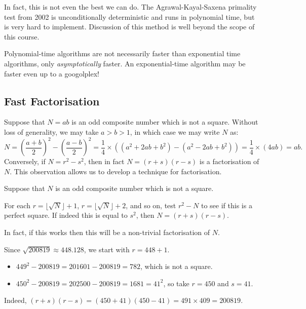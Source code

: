 \documentclass{article}
\begin{document}
\begin{note}
	In fact, this is not even the best we can do. The Agrawal-Kayal-Saxena primality test from 2002 is unconditionally deterministic and runs in polynomial time, but is very hard to implement. Discussion of this method is well beyond the scope of this course.
\end{note}

\begin{note}
	Polynomial-time algorithms are not necessarily faster than exponential time algorithms, only \textit{asymptotically} faster. An exponential-time algorithm may be faster even up to a googolplex!
\end{note}


\subsection{Fast Factorisation}
\label{subsection-primality-testing-factorisation}

Suppose that $N = ab$ is an odd composite number which is not a square. Without loss of generality, we may take $a > b > 1$, in which case we may write $N$ as:
\[
N =
\left( \frac{a+b}{2} \right)^2 -
\left( \frac{a-b}{2} \right)^2 =
\frac{1}{4} \times \left( 
\left( a^2 + 2ab + b^2 \right) -
\left( a^2 - 2ab + b^2 \right)
\right)
= \frac{1}{4} \times (4ab) = ab.
\]
Conversely, if $N = r^2 - s^2$, then in fact $N = (r+s)(r-s)$ is a factorisation of $N$. This observation allows us to develop a technique for factorisation.

\begin{definition}
	Suppose that $N$ is an odd composite number which is not a square.
	
    For each $r = \lfloor \sqrt N \rfloor + 1$, $r = \lfloor \sqrt N \rfloor + 2$, and so on, test $r^2 - N$ to see if this is a perfect square. If indeed this is equal to $s^2$, then $N = (r + s)(r-s)$.
\end{definition}

\begin{note}
	In fact, if this works then this will be a non-trivial factorisation of $N$.
\end{note}

\begin{example}[Factorising 200819]
    Since $\sqrt{200819} \approx 448.128$, we start with $r = 448 + 1$.
    \begin{itemize}
    	\item $449^2 - 200819 = 201601 - 200819 = 782$, which is not a square.
    	\item $450^2 - 200819 = 202500 - 200819 = 1681 = 41^2$, so take $r = 450$ and $s = 41$.
    \end{itemize}
    Indeed, $(r+s)(r-s) = (450+41)(450-41) = 491 \times 409 = 200819$.
\end{example}
\end{document}

